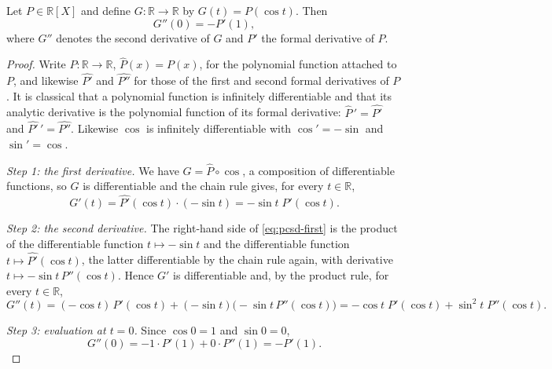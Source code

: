 \begin{lemma}
Let $P\in\mathbb{R}[X]$ and define $G:\mathbb{R}\to\mathbb{R}$ by
$G(t)=P(\cos t)$. Then
\[
  G''(0)=-P'(1),
\]
where $G''$ denotes the second derivative of $G$ and $P'$ the formal derivative
of $P$.
\end{lemma}
\begin{proof}
Write $\widehat{P}:\mathbb{R}\to\mathbb{R}$, $\widehat{P}(x)=P(x)$, for the
polynomial function attached to $P$, and likewise $\widehat{P'}$ and
$\widehat{P''}$ for those of the first and second formal derivatives of $P$. It
is classical that a polynomial function is infinitely differentiable and that
its analytic derivative is the polynomial function of its formal derivative:
$\widehat{P}\,'=\widehat{P'}$ and $\widehat{P'}\,'=\widehat{P''}$. Likewise
$\cos$ is infinitely differentiable with $\cos'=-\sin$ and $\sin'=\cos$.

\emph{Step 1: the first derivative.} We have $G=\widehat{P}\circ\cos$, a
composition of differentiable functions, so $G$ is differentiable and the chain
rule gives, for every $t\in\mathbb{R}$,
\begin{equation}\label{eq:pcsd-first}
  G'(t)=\widehat{P'}(\cos t)\cdot(-\sin t)=-\sin t\;P'(\cos t).
\end{equation}

\emph{Step 2: the second derivative.} The right-hand side of
\eqref{eq:pcsd-first} is the product of the differentiable function
$t\mapsto-\sin t$ and the differentiable function
$t\mapsto\widehat{P'}(\cos t)$, the latter differentiable by the chain rule
again, with derivative $t\mapsto-\sin t\,P''(\cos t)$. Hence $G'$ is
differentiable and, by the product rule, for every $t\in\mathbb{R}$,
\[
  G''(t)=(-\cos t)\,P'(\cos t)+(-\sin t)\bigl(-\sin t\,P''(\cos t)\bigr)
        =-\cos t\;P'(\cos t)+\sin^2 t\;P''(\cos t).
\]

\emph{Step 3: evaluation at $t=0$.} Since $\cos 0=1$ and $\sin 0=0$,
\[
  G''(0)=-1\cdot P'(1)+0\cdot P''(1)=-P'(1).
\]
\end{proof}
